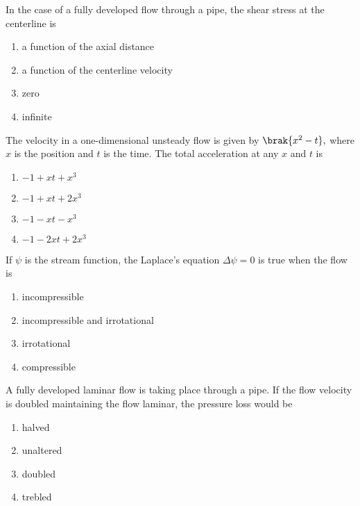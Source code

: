 \iffalse
\chapter{2012}
\author{EE24BTECH11008}
\section{xe}
\fi
    \item In the case of a fully developed flow through a pipe, the shear stress at the centerline is
    \begin{enumerate}
        \item a function of the axial distance
        \item a function of the centerline velocity
        \item zero
        \item infinite
    \end{enumerate}
    \item The velocity in a one-dimensional unsteady flow is given by $\brak{x^2-t},$ where $x$ is the position and $t$ is the time. The total acceleration at any $x$ and $t$ is
    \begin{enumerate}
        \item $-1+xt+x^3$
        \item $-1+xt+2x^3$
        \item $-1-xt-x^3$
        \item $-1-2xt+2x^3$
    \end{enumerate}
    \item If $\psi$ is the stream function, the Laplace's equation $\Delta \psi=0$ is true when the flow is
    \begin{enumerate}
        \item incompressible
        \item incompressible and irrotational
        \item irrotational
        \item compressible
    \end{enumerate}
    \item A fully developed laminar flow is taking place through a pipe. If the flow velocity is doubled maintaining the flow laminar, the pressure loss would be
    \begin{enumerate}
        \item halved
        \item unaltered
        \item doubled
        \item trebled
    \end{enumerate}
